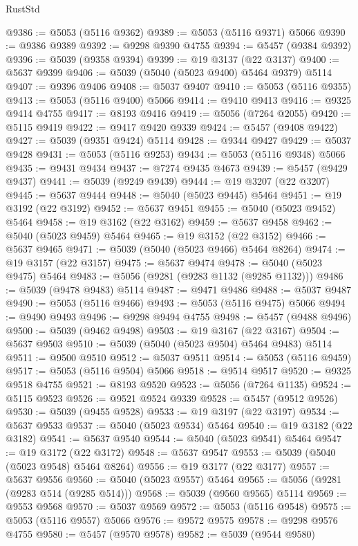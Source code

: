 \begin{lexlean}{RustStd}
\begin{coremodule}
@9386 := @5053 (@5116 @9362)
@9389 := @5053 (@5116 @9371) @5066
@9390 := @9386 @9389
@9392 := @9298 @9390 @4755
@9394 := @5457 (@9384 @9392)
@9396 := @5039 (@9358 @9394)
@9399 := @19 @3137 (@22 @3137)
@9400 := @5637 @9399
@9406 := @5039 (@5040 (@5023 @9400) @5464 @9379) @5114
@9407 := @9396 @9406
@9408 := @5037 @9407
@9410 := @5053 (@5116 @9355)
@9413 := @5053 (@5116 @9400) @5066
@9414 := @9410 @9413
@9416 := @9325 @9414 @4755
@9417 := @8193 @9416
@9419 := @5056 (@7264 @2055)
@9420 := @5115 @9419
@9422 := @9417 @9420 @9339
@9424 := @5457 (@9408 @9422)
@9427 := @5039 (@9351 @9424) @5114
@9428 := @9344 @9427
@9429 := @5037 @9428
@9431 := @5053 (@5116 @9253)
@9434 := @5053 (@5116 @9348) @5066
@9435 := @9431 @9434
@9437 := @7274 @9435 @4673
@9439 := @5457 (@9429 @9437)
@9441 := @5039 (@9249 @9439)
@9444 := @19 @3207 (@22 @3207)
@9445 := @5637 @9444
@9448 := @5040 (@5023 @9445) @5464
@9451 := @19 @3192 (@22 @3192)
@9452 := @5637 @9451
@9455 := @5040 (@5023 @9452) @5464
@9458 := @19 @3162 (@22 @3162)
@9459 := @5637 @9458
@9462 := @5040 (@5023 @9459) @5464
@9465 := @19 @3152 (@22 @3152)
@9466 := @5637 @9465
@9471 := @5039 (@5040 (@5023 @9466) @5464 @8264)
@9474 := @19 @3157 (@22 @3157)
@9475 := @5637 @9474
@9478 := @5040 (@5023 @9475) @5464
@9483 := @5056 (@9281 (@9283 @1132 (@9285 @1132)))
@9486 := @5039 (@9478 @9483) @5114
@9487 := @9471 @9486
@9488 := @5037 @9487
@9490 := @5053 (@5116 @9466)
@9493 := @5053 (@5116 @9475) @5066
@9494 := @9490 @9493
@9496 := @9298 @9494 @4755
@9498 := @5457 (@9488 @9496)
@9500 := @5039 (@9462 @9498)
@9503 := @19 @3167 (@22 @3167)
@9504 := @5637 @9503
@9510 := @5039 (@5040 (@5023 @9504) @5464 @9483) @5114
@9511 := @9500 @9510
@9512 := @5037 @9511
@9514 := @5053 (@5116 @9459)
@9517 := @5053 (@5116 @9504) @5066
@9518 := @9514 @9517
@9520 := @9325 @9518 @4755
@9521 := @8193 @9520
@9523 := @5056 (@7264 @1135)
@9524 := @5115 @9523
@9526 := @9521 @9524 @9339
@9528 := @5457 (@9512 @9526)
@9530 := @5039 (@9455 @9528)
@9533 := @19 @3197 (@22 @3197)
@9534 := @5637 @9533
@9537 := @5040 (@5023 @9534) @5464
@9540 := @19 @3182 (@22 @3182)
@9541 := @5637 @9540
@9544 := @5040 (@5023 @9541) @5464
@9547 := @19 @3172 (@22 @3172)
@9548 := @5637 @9547
@9553 := @5039 (@5040 (@5023 @9548) @5464 @8264)
@9556 := @19 @3177 (@22 @3177)
@9557 := @5637 @9556
@9560 := @5040 (@5023 @9557) @5464
@9565 := @5056 (@9281 (@9283 @514 (@9285 @514)))
@9568 := @5039 (@9560 @9565) @5114
@9569 := @9553 @9568
@9570 := @5037 @9569
@9572 := @5053 (@5116 @9548)
@9575 := @5053 (@5116 @9557) @5066
@9576 := @9572 @9575
@9578 := @9298 @9576 @4755
@9580 := @5457 (@9570 @9578)
@9582 := @5039 (@9544 @9580)

\end{coremodule}
\end{lexlean}
